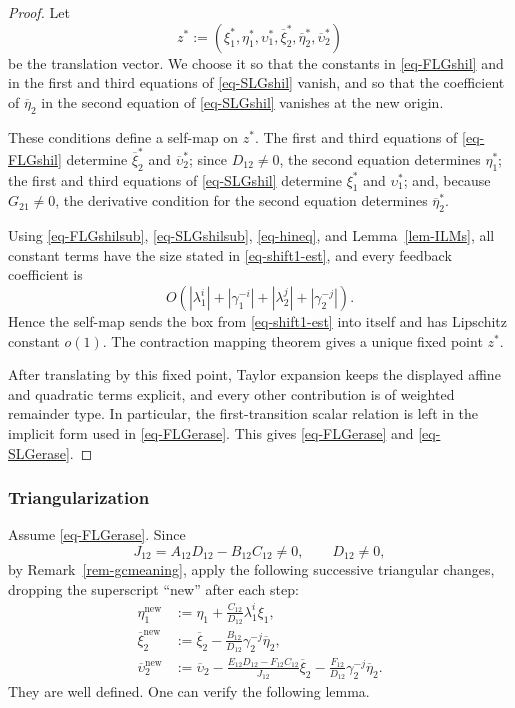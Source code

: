 \documentclass[11pt,a4paper]{article}
\theoremstyle{plain}
\theoremstyle{definition}
\theoremstyle{plain}
\numberwithin{equation}{section}
\begin{document}
\begin{proof}
Let
\[
z^* := (\xi_1^*,\eta_1^*,\upsilon_1^*,\overline{\xi}_2^*,\overline{\eta}_2^*,\overline{\upsilon}_2^*)
\]
be the translation vector. We choose it so that the constants in \eqref{eq-FLGshil} and in the first and third equations of \eqref{eq-SLGshil} vanish, and so that the coefficient of $\overline{\eta}_2$ in the second equation of \eqref{eq-SLGshil} vanishes at the new origin.

These conditions define a self-map on $z^*$. The first and third equations of \eqref{eq-FLGshil} determine $\overline{\xi}_2^*$ and $\overline{\upsilon}_2^*$; since $D_{12} \neq 0$, the second equation determines $\eta_1^*$; the first and third equations of \eqref{eq-SLGshil} determine $\xi_1^*$ and $\upsilon_1^*$; and, because $G_{21} \neq 0$, the derivative condition for the second equation determines $\overline{\eta}_2^*$.

Using \eqref{eq-FLGshilsub}, \eqref{eq-SLGshilsub}, \eqref{eq-hineq}, and Lemma~\ref{lem-ILMs}, all constant terms have the size stated in \eqref{eq-shift1-est}, and every feedback coefficient is
\[
O(|\lambda_1^i| + |\gamma_1^{-i}| + |\lambda_2^j| + |\gamma_2^{-j}|).
\]
Hence the self-map sends the box from \eqref{eq-shift1-est} into itself and has Lipschitz constant $o(1)$. The contraction mapping theorem gives a unique fixed point $z^*$.

After translating by this fixed point, Taylor expansion keeps the displayed affine and quadratic terms explicit, and every other contribution is of weighted remainder type. In particular, the first-transition scalar relation is left in the implicit form used in \eqref{eq-FLGerase}. This gives \eqref{eq-FLGerase} and \eqref{eq-SLGerase}.
\end{proof}

\subsubsection{Triangularization}
Assume \eqref{eq-FLGerase}. Since
\[
J_{12} = A_{12}D_{12} - B_{12}C_{12} \neq 0,
\qquad
D_{12} \neq 0,
\]
by Remark~\ref{rem-gcmeaning}, apply the following successive triangular changes, dropping the superscript ``new'' after each step:
\begin{align*}
\eta_1^\mathrm{new}
&:= \eta_1 + \frac{C_{12}}{D_{12}}\lambda_1^i \xi_1,
\\
\overline{\xi}_2^\mathrm{new}
&:= \overline{\xi}_2 - \frac{B_{12}}{D_{12}}\gamma_2^{-j}\overline{\eta}_2,
\\
\overline{\upsilon}_2^\mathrm{new}
&:= \overline{\upsilon}_2
- \frac{E_{12}D_{12} - F_{12}C_{12}}{J_{12}}\overline{\xi}_2
- \frac{F_{12}}{D_{12}}\gamma_2^{-j}\overline{\eta}_2.
\end{align*}
They are well defined. One can verify the following lemma.
\end{document}
